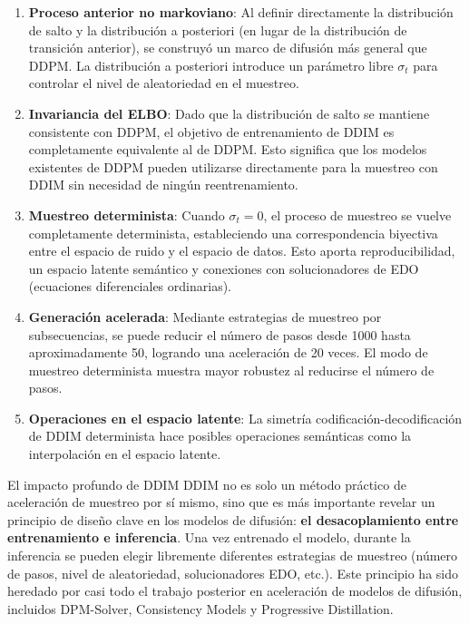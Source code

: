 \documentclass[a4paper]{article}
\begin{document}
\begin{enumerate}
    \item \textbf{Proceso anterior no markoviano}: Al definir directamente la distribución de salto y la distribución a posteriori (en lugar de la distribución de transición anterior), se construyó un marco de difusión más general que DDPM. La distribución a posteriori introduce un parámetro libre $\sigma_t$ para controlar el nivel de aleatoriedad en el muestreo.

    \item \textbf{Invariancia del ELBO}: Dado que la distribución de salto se mantiene consistente con DDPM, el objetivo de entrenamiento de DDIM es completamente equivalente al de DDPM. Esto significa que los modelos existentes de DDPM pueden utilizarse directamente para la muestreo con DDIM sin necesidad de ningún reentrenamiento.

    \item \textbf{Muestreo determinista}: Cuando $\sigma_t = 0$, el proceso de muestreo se vuelve completamente determinista, estableciendo una correspondencia biyectiva entre el espacio de ruido y el espacio de datos. Esto aporta reproducibilidad, un espacio latente semántico y conexiones con solucionadores de EDO (ecuaciones diferenciales ordinarias).

    \item \textbf{Generación acelerada}: Mediante estrategias de muestreo por subsecuencias, se puede reducir el número de pasos desde 1000 hasta aproximadamente 50, logrando una aceleración de 20 veces. El modo de muestreo determinista muestra mayor robustez al reducirse el número de pasos.

    \item \textbf{Operaciones en el espacio latente}: La simetría codificación-decodificación de DDIM determinista hace posibles operaciones semánticas como la interpolación en el espacio latente.
\end{enumerate}

\begin{importantbox}{El impacto profundo de DDIM}
DDIM no es solo un método práctico de aceleración de muestreo por sí mismo, sino que es más importante revelar un principio de diseño clave en los modelos de difusión: \textbf{el desacoplamiento entre entrenamiento e inferencia}. Una vez entrenado el modelo, durante la inferencia se pueden elegir libremente diferentes estrategias de muestreo (número de pasos, nivel de aleatoriedad, solucionadores EDO, etc.). Este principio ha sido heredado por casi todo el trabajo posterior en aceleración de modelos de difusión, incluidos DPM-Solver, Consistency Models y Progressive Distillation.
\end{importantbox}
\end{document}
